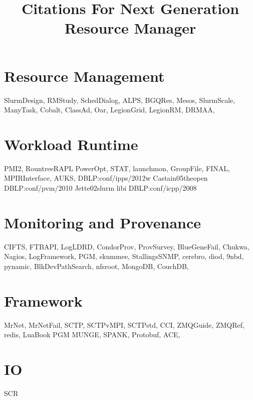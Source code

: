 \documentclass{article}
\newcommand{\ngrmfull}{Next Generation Resource Manager}
\begin{document}
\title{Citations For \ngrmfull}
\maketitle

\section{Resource Management}

SlurmDesign\cite{SlurmDesign},
RMStudy\cite{RMStudy},
SchedDialog\cite{SchedDialog},
ALPS\cite{ALPS},
BGQRes\cite{BGQRes},
Mesos\cite{Mesos},
SlurmScale\cite{SlurmScale},
ManyTask\cite{ManyTask},
Cobalt\cite{Cobalt},
ClassAd\cite{ClassAd},
Oar\cite{Oar},
LegionGrid\cite{LegionGrid},
LegionRM\cite{LegionRM},
DRMAA\cite{DRMAA},

\section{Workload Runtime}

PMI2\cite{PMI2},
RountreeRAPL\cite{RountreeRAPL}
PowerOpt\cite{PowerOpt},
STAT\cite{STAT},
launchmon\cite{launchmon},
GroupFile\cite{GroupFile},
FINAL\cite{FINAL},
MPIRInterface\cite{MPIRInterface},
AUKS\cite{AUKS},
DBLP:conf/ipps/2012w\cite{DBLP:conf/ipps/2012w}
Castain05theopen\cite{Castain05theopen}
DBLP:conf/pvm/2010\cite{DBLP:conf/pvm/2010}
Jette02slurm\cite{Jette02slurm}
libi\cite{libi}
DBLP:conf/icpp/2008\cite{DBLP:conf/icpp/2008}

\section{Monitoring and Provenance}

CIFTS\cite{CIFTS},
FTBAPI\cite{FTBAPI},
LogLDRD\cite{LogLDRD},
CondorProv\cite{CondorProv},
ProvSurvey\cite{ProvSurvey},
BlueGeneFail\cite{BlueGeneFail},
Chukwa\cite{Chukwa},
Nagios\cite{Nagios},
LogFramework\cite{LogFramework},
PGM\cite{rfc3208},
skummee\cite{skummee},
StallingsSNMP\cite{StallingsSNMP},
cerebro\cite{cerebro},
diod\cite{diod},
9nbd\cite{9nbd},
pynamic\cite{pynamic},
BlkDevPathSearch\cite{BlkDevPathSearch},
nfsroot\cite{nfsroot},
MongoDB\cite{MongoDB},
CouchDB\cite{CouchDB},

\section{Framework}

MrNet\cite{MrNet},
MrNetFail\cite{MrNetFail},
SCTP\cite{SCTP},
SCTPvMPI\cite{SCTPvMPI},
SCTPstd\cite{SCTPstd},
CCI\cite{CCI},
ZMQGuide\cite{ZMQGuide},
ZMQRef\cite{ZMQRef},
redis\cite{redis},
LuaBook\cite{LuaBook}
PGM\cite{rfc3208}
MUNGE\cite{munge},
SPANK\cite{SPANK},
Protobuf\cite{Protobuf},
ACE\cite{ACE},

\section{IO}
SCR\cite{SCR}



\end{document}
